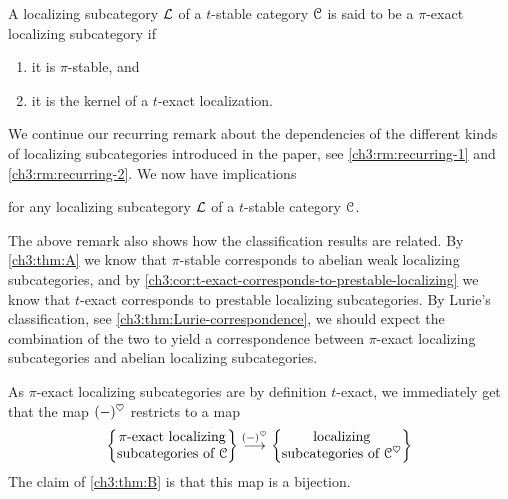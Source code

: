 \begin{definition}
    \label{ch3:def:pi-exact-localizing-subcategory}
    A localizing subcategory $\mathcal{L}$ of a $t$-stable category $\EuScript{C}$ is said to be a $\pi$-exact localizing subcategory if 
    \begin{enumerate}
        \item it is $\pi$-stable, and
        \item it is the kernel of a $t$-exact localization. 
    \end{enumerate}
\end{definition}

\begin{remark}
    \label{ch3:rm:recurring-3}
    We continue our recurring remark about the dependencies of the different kinds of localizing subcategories introduced in the paper, see \cref{ch3:rm:recurring-1} and \cref{ch3:rm:recurring-2}. We now have implications
    \begin{center}
    \end{center}
    for any localizing subcategory $\mathcal{L}$ of a $t$-stable category $\EuScript{C}$. 
\end{remark}

\begin{remark}
    The above remark also shows how the classification results are related. By \cref{ch3:thm:A} we know that $\pi$-stable corresponds to abelian weak localizing subcategories, and by \cref{ch3:cor:t-exact-corresponds-to-prestable-localizing} we know that $t$-exact corresponds to prestable localizing subcategories. By Lurie's classification, see \cref{ch3:thm:Lurie-correspondence}, we should expect the combination of the two to yield a correspondence between $\pi$-exact localizing subcategories and abelian localizing subcategories. 
\end{remark}

As $\pi$-exact localizing subcategories are by definition $t$-exact, we immediately get that the map $(-)^\heartsuit$ restricts to a map 
\[\left\{ \begin{matrix} \pi\text{-exact localizing}\\ \text{subcategories of }\EuScript{C} \end{matrix} \right\}\overset{(-)^\heartsuit}{\longrightarrow} \left\{ \begin{matrix} \text{localizing}\\ \text{subcategories of }\EuScript{C}^\heartsuit \end{matrix} \right\}\]
The claim of \cref{ch3:thm:B} is that this map is a bijection.  

